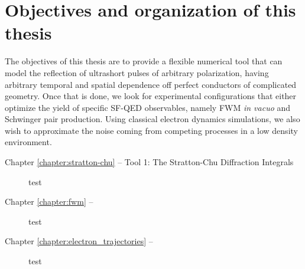 \documentclass[11pt,SymmetricalJury]{inrsthesis/inrsthesis}
\begin{document}
\section{Objectives and organization of this thesis}
\label{sec:intro.objectives}

The objectives of this thesis are to provide a flexible numerical tool that
can model the reflection of ultrashort pulses of arbitrary polarization, having
arbitrary temporal and spatial dependence off perfect conductors of complicated
geometry. Once that is done, we look for experimental configurations that either
optimize the yield of specific SF-QED observables, namely FWM \textit{in vacuo}
and Schwinger pair production. Using classical electron dynamics simulations, we
also wish to approximate the noise coming from competing processes in a low
density environment.

\begin{description}
  \item [Chapter \ref{chapter:stratton-chu} -- Tool 1: The Stratton-Chu Diffraction Integrals]
  test
  \item [Chapter \ref{chapter:fwm} -- ]
  test
  \item [Chapter \ref{chapter:electron_trajectories} -- ]
  test
\end{description}


\end{document}
